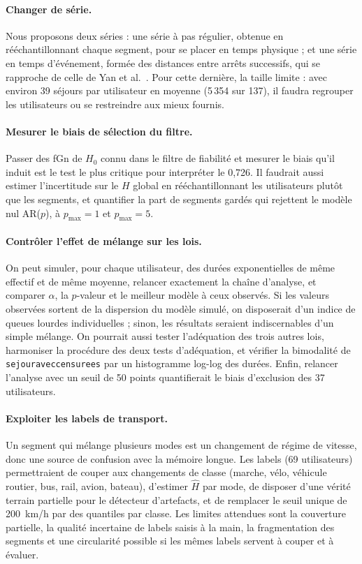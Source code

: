 \documentclass[11pt,a4paper]{article}
\newcommand{\code}[1]{\texttt{#1}}
\renewcommand{\_}{\textunderscore\penalty0\hspace{0pt}}
\begin{document}
\paragraph{Changer de série.} Nous proposons deux séries : une série à pas régulier,
obtenue en rééchantillonnant chaque segment, pour se placer en temps physique ; et une série
en temps d'événement, formée des distances entre arrêts successifs, qui se rapproche de celle
de Yan et al.~\cite{yan2014}. Pour cette dernière, la taille limite : avec environ 39
séjours par utilisateur en moyenne (5\,354 sur 137), il faudra regrouper les utilisateurs ou
se restreindre aux mieux fournis.

\paragraph{Mesurer le biais de sélection du filtre.} Passer des fGn de $H_0$ connu dans le
filtre de fiabilité et mesurer le biais qu'il induit est le test le plus critique pour
interpréter le 0,726. Il faudrait aussi estimer l'incertitude sur le $H$ global en
rééchantillonnant les utilisateurs plutôt que les segments, et quantifier la part de
segments gardés qui rejettent le modèle nul AR($p$), à $p_{\max}=1$ et $p_{\max}=5$.

\paragraph{Contrôler l'effet de mélange sur les lois.} On peut simuler, pour chaque
utilisateur, des durées exponentielles de même effectif et de même moyenne, relancer
exactement la chaîne d'analyse, et comparer $\alpha$, la $p$-valeur et le meilleur modèle à
ceux observés. Si les valeurs observées sortent de la dispersion du modèle simulé, on
disposerait d'un indice de queues lourdes individuelles ; sinon, les résultats seraient
indiscernables d'un simple mélange. On pourrait aussi tester l'adéquation des trois autres
lois, harmoniser la procédure des deux tests d'adéquation, et vérifier la bimodalité de
\code{sejour\_avec\_censurees} par un histogramme log-log des durées. Enfin, relancer l'analyse
avec un seuil de 50 points quantifierait le biais d'exclusion des 37 utilisateurs.

\paragraph{Exploiter les labels de transport.} Un segment qui mélange plusieurs modes est un
changement de régime de vitesse, donc une source de confusion avec la mémoire longue. Les
labels (69 utilisateurs) permettraient de couper aux changements de classe (marche, vélo,
véhicule routier, bus, rail, avion, bateau), d'estimer $\hat H$ par mode, de disposer d'une
vérité terrain partielle pour le détecteur d'artefacts, et de remplacer le seuil unique de
200~km/h par des quantiles par classe. Les limites attendues sont la couverture partielle,
la qualité incertaine de labels saisis à la main, la fragmentation des segments et une
circularité possible si les mêmes labels servent à couper et à évaluer.
\end{document}
